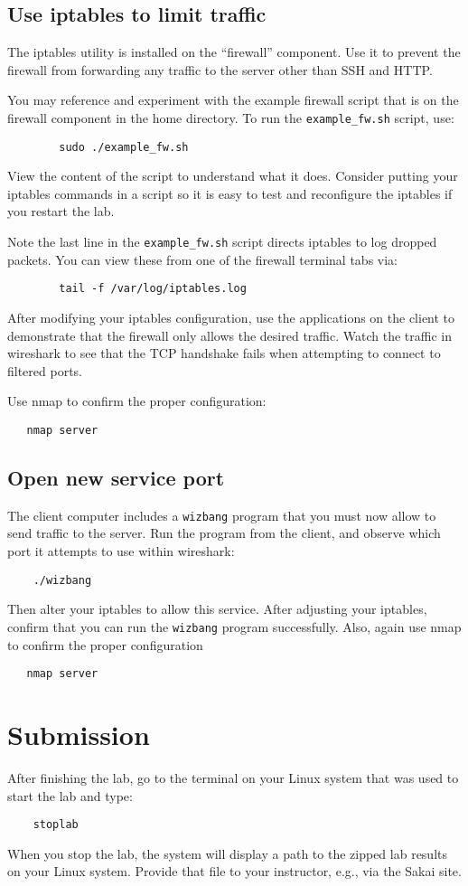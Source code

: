 \subsection{Use iptables to limit traffic}
The iptables utility is installed on the ``firewall'' component.
Use it to prevent the firewall from forwarding any traffic
to the server other than SSH and HTTP.

You may reference and experiment with the example firewall script that
is on the firewall component in the home directory.  
To run the {\tt example\_fw.sh} script, use:
\begin{verbatim}
        sudo ./example_fw.sh
\end{verbatim}
View the content of the script to understand what it does.
Consider putting your iptables commands in a script so it is easy
to test and reconfigure the iptables if you restart the lab.

Note the last line in the {\tt example\_fw.sh} script directs iptables
to log dropped packets.  You can view these from one of the firewall terminal
tabs via:
\begin{verbatim}
        tail -f /var/log/iptables.log
\end{verbatim}

After modifying your iptables configuration, use the applications on the client to
demonstrate that the firewall only allows the desired traffic.
Watch the traffic in wireshark to see that the TCP handshake fails
when attempting to connect to filtered ports.

Use nmap to confirm the proper configuration:
\begin{verbatim}
   nmap server
\end{verbatim}


\subsection{Open new service port}
The client computer includes a {\tt wizbang} program that you must now allow to send
traffic to the server.  Run the program from the client, and observe which port it
attempts to use within wireshark:
\begin{verbatim}
    ./wizbang
\end{verbatim}
\noindent Then alter your iptables to allow this service.  After adjusting your iptables, 
confirm that you can run the {\tt wizbang} program successfully.
Also, again use nmap to confirm the proper configuration
\begin{verbatim}
   nmap server
\end{verbatim}

\section{Submission}
After finishing the lab, go to the terminal on your Linux system that was used to start the lab and type:
\begin{verbatim}
    stoplab 
\end{verbatim}
When you stop the lab, the system will display a path to the zipped lab results on your Linux system.  Provide that file to 
your instructor, e.g., via the Sakai site.

\copyrightnotice


